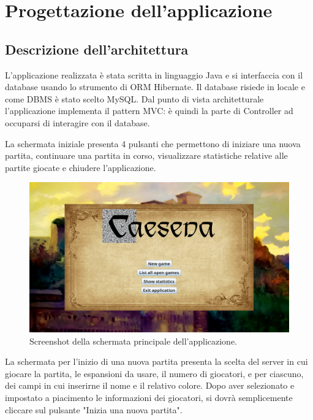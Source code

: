 \section{Progettazione dell'applicazione}
\subsection{Descrizione dell'architettura}
L'applicazione realizzata è stata scritta in linguaggio Java e si interfaccia con il database usando lo strumento di ORM Hibernate. Il database risiede in locale e come DBMS è stato scelto MySQL. Dal punto di vista architetturale l'applicazione implementa il pattern MVC: è quindi la parte di Controller ad occuparsi di interagire con il database.
\medskip

La schermata iniziale presenta 4 pulsanti che permettono di iniziare una nuova partita, continuare una partita in corso, visualizzare statistiche relative alle partite giocate e chiudere l'applicazione.

\begin{figure}[ht]
    \centering\includegraphics[scale=0.25]{images/startView.png}
    \caption{Screenshot della schermata principale dell'applicazione.}
\end{figure}

La schermata per l'inizio di una nuova partita presenta la scelta del server in cui giocare la partita, le espansioni da usare, il numero di giocatori, e per ciascuno, dei campi in cui inserirne il nome e il relativo colore. Dopo aver selezionato e impostato a piacimento le informazioni dei giocatori, si dovrà semplicemente cliccare sul pulsante "Inizia una nuova partita".

